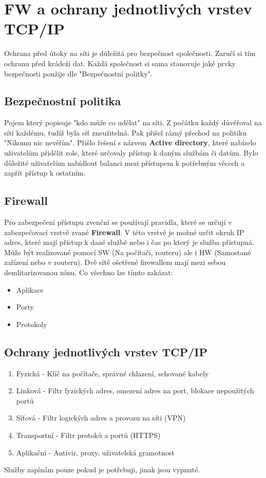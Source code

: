 \section{FW a ochrany jednotlivých vrstev TCP/IP}
\label{sec:fw-a-ochrana-tcp-ip}
Ochrana před útoky na síti je důležitá pro bezpečnost společnosti.
Zaručí si tím ochranu před krádeží dat.
Každá společnost si sama stanovuje jaké prvky bezpečnosti použije dle "Bezpečnostní politky".
\subsection{Bezpečnostní politika}
Pojem který popisuje "kdo může co udělat" na síti.
Z počátku každý důvěřoval na síti každému, tudíž byla síť zneužitelná.
Pak přišel rázný přechod na politiku "Nikomu nic nevěřím".
Přišlo řešení s názvem \textbf{Active directory}, které nabízelo uživatelům přidělit role, které určovaly přístup k daným službám či datům.
Bylo důležité uživatelům nabídlout balanci mezi přístupem k potřebným věcech a zapřít přístup k ostatním.
\subsection{Firewall}
Pro zabezpečení přístupu zvenční se používají pravidla, které se určují v zabezpečovací vrstvě zvané \textbf{Firewall}.
V této vrstvě je možné určit okruh IP adres, které mají přístup k dané službě nebo i čas po který je služba přístupná.
Může být realizované pomocí SW (Na počítači, routeru) ale i HW (Samostané zařízení nebo v routeru).
Dvě sítě ošetřené firewallem mají mezi sebou demlitarizovanou zónu.
Co všechno lze tímto zakázat:
\begin{itemize}
  \item Aplikace
  \item Porty
  \item Protokoly
\end{itemize}
\subsection{Ochrany jednotlivých vrstev TCP/IP}
\begin{enumerate}
  \item Fyzická - Klíč na počítače, správné chlazení, schované kabely
  \item Linková - Filtr fyzických adres, omezení adres na port, blokace nepoužitých portů
  \item Síťová - Filtr logických adres a provozu na síti (VPN)
  \item Transportní - Filtr protoků a portů (HTTPS)
  \item Aplikační - Antivir, proxy, uživatelská gramotnost
\end{enumerate}
Služby zapínám pouze pokud je potřebuji, jinak jsou vypnuté.

